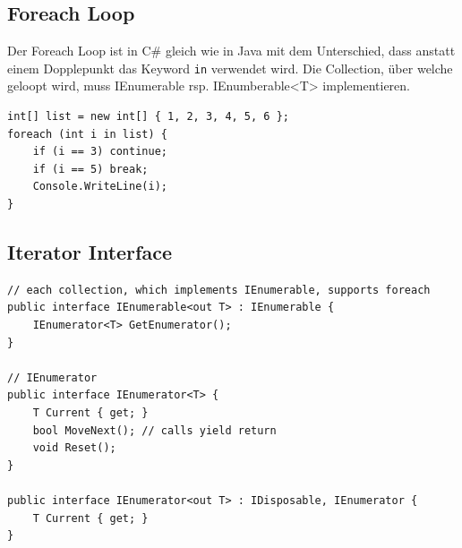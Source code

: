 \documentclass[
a4paper,
oneside,
10pt,
fleqn,
headsepline,
toc=listofnumbered, 
bibliography=totocnumbered]{scrartcl}
\begin{document}
\subsection{Foreach Loop}
Der Foreach Loop ist in C\# gleich wie in Java mit dem Unterschied, dass anstatt einem Dopplepunkt das Keyword \lstinline|in| verwendet wird. Die Collection, über welche geloopt wird, muss IEnumerable rsp. IEnumberable<T> implementieren. 
\begin{lstlisting}
int[] list = new int[] { 1, 2, 3, 4, 5, 6 };
foreach (int i in list) {
	if (i == 3) continue;
	if (i == 5) break;
	Console.WriteLine(i);
}
\end{lstlisting}

\subsection{Iterator Interface}
\begin{lstlisting}
// each collection, which implements IEnumerable, supports foreach
public interface IEnumerable<out T> : IEnumerable {
	IEnumerator<T> GetEnumerator();
}

// IEnumerator
public interface IEnumerator<T> {
	T Current { get; }
	bool MoveNext(); // calls yield return
	void Reset();
}

public interface IEnumerator<out T> : IDisposable, IEnumerator {
	T Current { get; }
}
\end{lstlisting}

\clearpage
\end{document}
